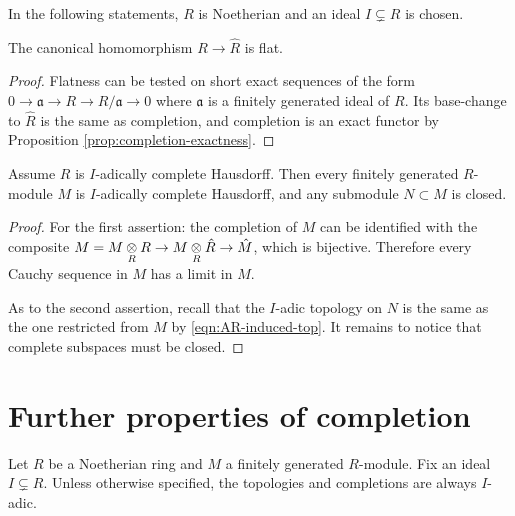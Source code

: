 In the following statements, $R$ is Noetherian and an ideal $I \subsetneq R$ is chosen.
\begin{corollary}
	The canonical homomorphism $R \to \hat{R}$ is flat.
\end{corollary}
\begin{proof}
	Flatness can be tested on short exact sequences of the form $0 \to \mathfrak{a} \to R \to R/\mathfrak{a} \to 0$ where $\mathfrak{a}$ is a finitely generated ideal of $R$. Its base-change to $\hat{R}$ is the same as completion, and completion is an exact functor by Proposition \ref{prop:completion-exactness}.
\end{proof}

\begin{corollary}\label{prop:completion-auto}
	Assume $R$ is $I$-adically complete Hausdorff. Then every finitely generated $R$-module $M$ is $I$-adically complete Hausdorff, and any submodule $N \subset M$ is closed.
\end{corollary}
\begin{proof}
	For the first assertion: the completion of $M$ can be identified with the composite $M = M \underset{R}{\otimes} R \to M \underset{R}{\otimes} \hat{R} \to \hat{M}$, which is bijective. Therefore every Cauchy sequence in $M$ has a limit in $M$.

	As to the second assertion, recall that the $I$-adic topology on $N$ is the same as the one restricted from $M$ by \eqref{eqn:AR-induced-top}. It remains to notice that complete subspaces must be closed.
\end{proof}

\section{Further properties of completion}
Let $R$ be a Noetherian ring and $M$ a finitely generated $R$-module. Fix an ideal $I \subsetneq R$. Unless otherwise specified, the topologies and completions are always $I$-adic.

